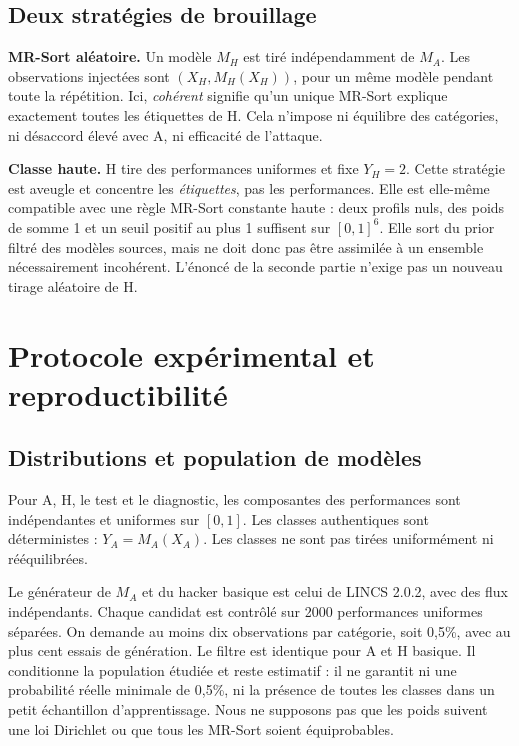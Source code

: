 \documentclass[11pt,a4paper]{article}
\begin{document}
\subsection{Deux stratégies de brouillage}

\textbf{MR-Sort aléatoire.} Un modèle $M_H$ est tiré indépendamment de $M_A$.
Les observations injectées sont $(X_H,M_H(X_H))$, pour un même modèle pendant
toute la répétition. Ici, \emph{cohérent} signifie qu'un unique MR-Sort explique
exactement toutes les étiquettes de H. Cela n'impose ni équilibre des catégories,
ni désaccord élevé avec A, ni efficacité de l'attaque.

\textbf{Classe haute.} H tire des performances uniformes et fixe $Y_H=2$.
Cette stratégie est aveugle et concentre les \emph{étiquettes}, pas les
performances. Elle est elle-même compatible avec une règle MR-Sort constante
haute : deux profils nuls, des poids de somme 1 et un seuil positif au plus 1
suffisent sur $[0,1]^6$. Elle sort du prior filtré des modèles sources, mais
ne doit donc pas être assimilée à un ensemble nécessairement incohérent.
L'énoncé de la seconde partie n'exige pas un nouveau tirage aléatoire de H.

\section{Protocole expérimental et reproductibilité}
\subsection{Distributions et population de modèles}

Pour A, H, le test et le diagnostic, les composantes des performances sont
indépendantes et uniformes sur $[0,1]$. Les classes authentiques sont déterministes :
$Y_A=M_A(X_A)$. Les classes ne sont pas tirées uniformément ni rééquilibrées.

Le générateur de $M_A$ et du hacker basique est celui de LINCS 2.0.2, avec des
flux indépendants. Chaque candidat est contrôlé sur 2000 performances uniformes
séparées. On demande au moins dix observations par catégorie, soit 0,5\%, avec
au plus cent essais de génération. Le filtre est identique pour A et H basique.
Il conditionne la population étudiée et reste estimatif : il ne garantit ni
une probabilité réelle minimale de 0,5\%, ni la présence de toutes les classes
dans un petit échantillon d'apprentissage. Nous ne supposons pas que les poids
suivent une loi Dirichlet ou que tous les MR-Sort soient équiprobables.
\end{document}
